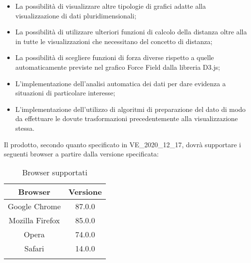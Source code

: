 \documentclass[../analisi-dei-requisiti.tex]{subfiles}
\begin{document}
\begin{itemize}
  \item La possibilità di visualizzare altre tipologie di grafici adatte alla visualizzazione di dati
        pluridimensionali;
  \item La possibilità di utilizzare ulteriori funzioni di calcolo della distanza oltre alla
         in tutte le visualizzazioni che necessitano del concetto di distanza;
  \item La possibilità di scegliere funzioni di forza diverse rispetto a quelle automaticamente previste nel grafico
        Force Field dalla libreria D3.js;
  \item L'implementazione dell'analisi automatica dei dati per dare evidenza a situazioni di particolare interesse;
  \item L'implementazione dell'utilizzo di algoritmi di preparazione del dato di modo da effettuare le dovute
        trasformazioni precedentemente alla visualizzazione stessa.
\end{itemize}

Il prodotto, secondo quanto specificato in \textsc{VE\_2020\_12\_17}, dovrà supportare i seguenti browser a partire dalla versione specificata:

\begin{table}[!ht]
  \centering
  \label{tab:supporto_browser}
  \renewcommand{\arraystretch}{2}

  \begin{tabular}{|c|c|}

    \hline
    \rowcolor{lightgray}

    \textbf{Browser} & \textbf{Versione} \\
    \hline
    Google Chrome    & 87.0.0            \\
    Mozilla Firefox  & 85.0.0            \\
    Opera            & 74.0.0            \\
    Safari           & 14.0.0            \\
    \hline
    \rowcolor{white}
  \end{tabular}
  \caption{Browser supportati}
\end{table}
\end{document}
